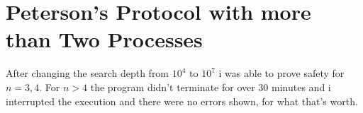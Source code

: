 \section{Peterson's Protocol with more than Two Processes}
After changing the search depth from $10^4$ to $10^7$ i was able to prove safety for $n=3,4$. For $n>4$ the program didn't terminate for over 30 minutes and i interrupted the execution and there were no errors shown, for what that's worth.
